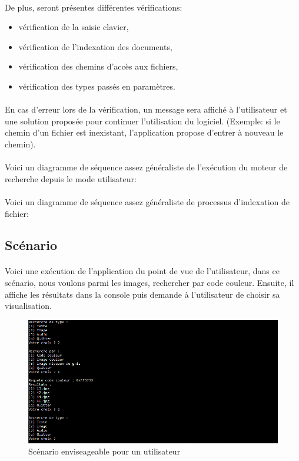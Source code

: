 \documentclass[../main.tex]{subfiles}
\begin{document}
    \paragraph{}
    De plus, seront présentes différentes vérifications:
    \begin{itemize}
        \item vérification de la saisie clavier,
        \item vérification de l’indexation des documents,
        \item vérification des chemins d’accès aux fichiers,
        \item vérification des types passés en paramètres.
    \end{itemize}

    \paragraph{}
    En cas d’erreur lors de la vérification, un message sera affiché à l’utilisateur et une solution proposée pour continuer l’utilisation du logiciel. (Exemple: si le chemin d’un fichier est inexistant, l’application propose d’entrer à nouveau le chemin).

    \paragraph{}
    Voici un diagramme de séquence assez généraliste de l’exécution du moteur de recherche depuis le mode utilisateur:

    \paragraph{}
    Voici un diagramme de séquence assez généraliste de processus d’indexation de fichier:

    \subsection{Scénario}
    \paragraph{}
    Voici une exécution de l’application du point de vue de l’utilisateur, dans ce scénario, nous voulons parmi les images, rechercher par code couleur. Ensuite, il affiche les résultats dans la console puis demande à l'utilisateur de choisir sa visualisation.

    \begin{figure}[H]
        \centering
        \includegraphics[width=160mm]{use_cases/scenario utilisateur.PNG}
        \caption{Scénario enviseageable pour un utilisateur}
    \end{figure}
\end{document}
